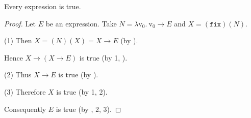 \documentclass{article}
\newcommand{\var}[1]{\textrm{v}_{#1}}
\newcommand{\abs}[2]{\lambda\var{#1}.\ #2}
\newcommand{\app}[2]{(#1)(#2)}
\newcommand{\fix}{\texttt{fix}}
\begin{document}
  \begin{forthel}
    \begin{theorem*}[title=Curry's paradox,id=curry_paradox]
      Every expression is true.
    \end{theorem*}
    \begin{proof}
      Let $E$ be an expression.
      Take $N = \abs{0}{\var{0} \rightarrow E}$ and $X = \app{\fix}{N}.$
  
      (1) Then $X = \app{N}{X} = X \rightarrow E$ (by ).
  
      Hence $X \rightarrow (X \rightarrow E)$ is true (by 1, ).
  
      (2) Thus $X \rightarrow E$ is true (by ).
  
      (3) Therefore $X$ is true (by 1, 2).
  
      Consequently $E$ is true (by , 2, 3).
    \end{proof}
  \end{forthel}

  \printbibliography
\end{document}
